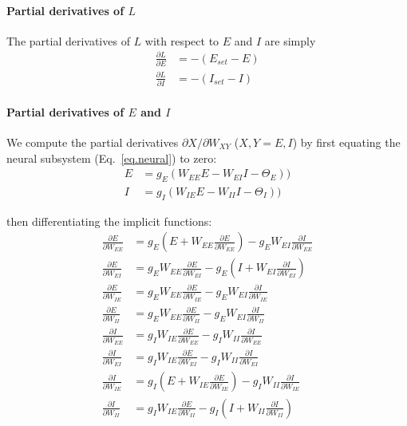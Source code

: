 \documentclass[twocolumn]{article}
\newcommand{\EE}{\mathit{EE}}
\newcommand{\EI}{\mathit{EI}}
\newcommand{\IE}{\mathit{IE}}
\newcommand{\II}{\mathit{II}}
\newcommand{\XY}{\mathit{XY}}
\newcommand{\set}{\mathit{set}}
\begin{document}
\paragraph{Partial derivatives of $L$}

The partial derivatives of $L$ with respect to $E$ and $I$ are simply
\begin{equation}
\begin{aligned}
\frac{\partial L}{\partial E} & = - (E_{\set} - E) \\
\frac{\partial L}{\partial I} & = - (I_{\set} - I)
\end{aligned}
\label{eq.LF_dLdEI}
\end{equation}



\paragraph{Partial derivatives of $E$ and $I$}

We compute the partial derivatives $\partial X/\partial W_{\XY}$ ($X,Y = E,I$) by first equating the neural subsystem (Eq.\ \ref{eq.neural}) to zero:
\begin{equation}
\begin{aligned}
E & = g_E(W_{\EE}E - W_{\EI}I - \Theta_E)) \\
I & = g_I(W_{\IE}E - W_{\II}I - \Theta_I))
\end{aligned}
\label{eq.LF_implicit_functions}
\end{equation}

\noindent then differentiating the implicit functions:
\begin{equation}
\begin{aligned}
\frac{\partial E}{\partial W_{\EE}} & = g_E(E + W_{\EE} \frac{\partial E}{\partial W_{\EE}}) - g_E W_{\EI} \frac{\partial I}{\partial W_{\EE}} \\
\frac{\partial E}{\partial W_{\EI}} & = g_E W_{\EE} \frac{\partial E}{\partial W_{\EI}} - g_E (I + W_{\EI} \frac{\partial I}{\partial W_{\EI}}) \\
\frac{\partial E}{\partial W_{\IE}} & = g_E W_{\EE} \frac{\partial E}{\partial W_{\IE}} - g_E W_{\EI}\frac{\partial I}{\partial W_{\IE}} \\
\frac{\partial E}{\partial W_{\II}} & = g_E W_{\EE} \frac{\partial E}{\partial W_{\II}} - g_E W_{\EI} \frac{\partial I}{\partial W_{\II}} \\
\frac{\partial I}{\partial W_{\EE}} & = g_I W_{\IE} \frac{\partial E}{\partial W_{\EE}} - g_I W_{\II} \frac{\partial I}{\partial W_{\EE}} \\
\frac{\partial I}{\partial W_{\EI}} & = g_I W_{\IE} \frac{\partial E}{\partial W_{\EI}} - g_I W_{\II} \frac{\partial I}{\partial W_{\EI}} \\
\frac{\partial I}{\partial W_{\IE}} & = g_I (E + W_{\IE} \frac{\partial E}{\partial W_{\IE}}) - g_I W_{\II} \frac{\partial I}{\partial W_{\IE}} \\
\frac{\partial I}{\partial W_{\II}} & = g_I W_{\IE} \frac{\partial E}{\partial W_{\II}} - g_I (I + W_{\II} \frac{\partial I}{\partial W_{\II}})
\end{aligned}
\label{eq.LF_implicit_derivs}
\end{equation}
\end{document}
